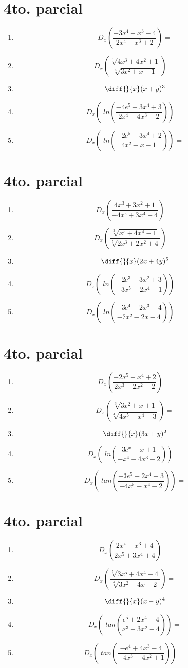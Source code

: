 \documentclass[oneside,spanish,letter]{article}
\begin{document}
\section{4to. parcial}
\begin{enumerate}
 \item $$ D_x \left( \frac{-3x^4-x^3-4}{2x^4-x^3+2}\right)=$$
 \item $$ D_x \left( \frac{\sqrt[3]{4x^3+4x^2+1}}{\sqrt[4]{3x^2+x-1}}\right)=$$
\item $$\diff{}{x}(x+y)^3$$
 \item $$ D_x \left(\;ln\left( \frac{-4e^5+3x^4+3}{2x^4-4x^3-2}\right)\right)=$$
 \item $$ D_x \left(\;ln\left( \frac{-2e^5+3x^4+2}{4x^2-x-1}\right)\right)=$$
 \end{enumerate}
  \newpage
\section{4to. parcial}
\begin{enumerate}
 \item $$ D_x \left( \frac{4x^3+3x^2+1}{-4x^5+3x^4+4}\right)=$$
 \item $$ D_x \left( \frac{\sqrt[3]{x^5+4x^4-1}}{\sqrt[5]{2x^3+2x^2+4}}\right)=$$
\item $$\diff{}{x}(2x+4y)^5$$
 \item $$ D_x \left(\;ln\left( \frac{-2e^3+3x^2+3}{-3x^5-2x^4-1}\right)\right)=$$
 \item $$ D_x \left(\;ln\left( \frac{-3e^4+2x^3-4}{-3x^2-2x-4}\right)\right)=$$
 \end{enumerate}
  \newpage
\section{4to. parcial}
\begin{enumerate}
 \item $$ D_x \left( \frac{-2x^5+x^4+2}{2x^3-2x^2-2}\right)=$$
 \item $$ D_x \left( \frac{\sqrt[3]{3x^2+x+1}}{\sqrt[4]{4x^5-x^4-3}}\right)=$$
\item $$\diff{}{x}(3x+y)^2$$
 \item $$ D_x \left(\;ln\left( \frac{3e^x-x+1}{-x^4-4x^3-2}\right)\right)=$$
 \item $$ D_x \left(\;tan\left( \frac{-3e^5+2x^4-3}{-4x^5-x^4-2}\right)\right)=$$
 \end{enumerate}
  \newpage
\section{4to. parcial}
\begin{enumerate}
 \item $$ D_x \left( \frac{2x^4-x^3+4}{2x^5+3x^4+4}\right)=$$
 \item $$ D_x \left( \frac{\sqrt[5]{3x^5+4x^4-4}}{\sqrt[4]{3x^2-4x+2}}\right)=$$
\item $$\diff{}{x}(x-y)^4$$
 \item $$ D_x \left(\;tan\left( \frac{e^5+2x^4-4}{x^3-3x^2-4}\right)\right)=$$
 \item $$ D_x \left(\;tan\left( \frac{-e^4+4x^3-4}{-4x^3-4x^2+1}\right)\right)=$$
 \end{enumerate}
  \newpage
\end{document}
